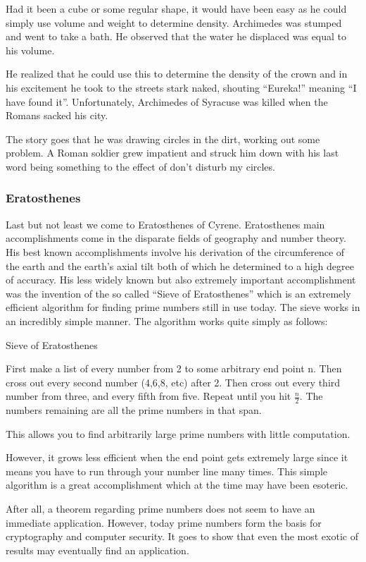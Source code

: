 Had it been a cube or some regular shape, it would have been easy as he
could simply use volume and weight to determine density. Archimedes was stumped and went to
take a bath. He observed that the water he displaced was equal to his volume.\newline

 He realized that he
could use this to determine the density of the crown and in his excitement he took to the streets
stark naked, shouting “Eureka!” meaning “I have found it”.
Unfortunately, Archimedes of Syracuse was killed when the Romans sacked his city.\newline

The story goes that he was drawing circles
in the dirt, working out some problem. A Roman soldier grew impatient and struck him down with
his last word being something to the effect of don’t disturb my circles. 

\subsubsection{Eratosthenes}

Last but not least we come to Eratosthenes of Cyrene.
Eratosthenes
main accomplishments
come in the disparate fields of geography and number theory. His best known accomplishments
involve his derivation of the circumference of the earth and the earth’s axial tilt both of which
he determined
to a high degree of accuracy.
His less widely known but also extremely important
accomplishment was the invention of the so called “Sieve of Eratosthenes” which is an extremely
efficient algorithm for finding prime numbers still in use today. The sieve works in an incredibly
simple manner. The algorithm works quite simply as follows:
\begin{theorem} Sieve of Eratosthenes\newline

First make a list of every number from 2 to some arbitrary end point n.\newline
Then cross out every second number (4,6,8, etc) after 2.\newline
Then cross out every third number from three, and every fifth from five.\newline
Repeat until you hit $\frac{n}{2}.$\newline
The numbers remaining are all the prime numbers in that span.
\end{theorem}
This allows you to find arbitrarily large prime numbers with little computation.\newline

However, it grows less efficient when the end point gets extremely large since it means you have to run through your number line many times. This simple algorithm is a great
accomplishment which at the time may have been
esoteric.\newline

 After all, a theorem regarding prime numbers does not seem to have an immediate application. However, today prime numbers form the basis for cryptography and computer security. It goes
to show that even the most exotic of results may eventually find an application.
